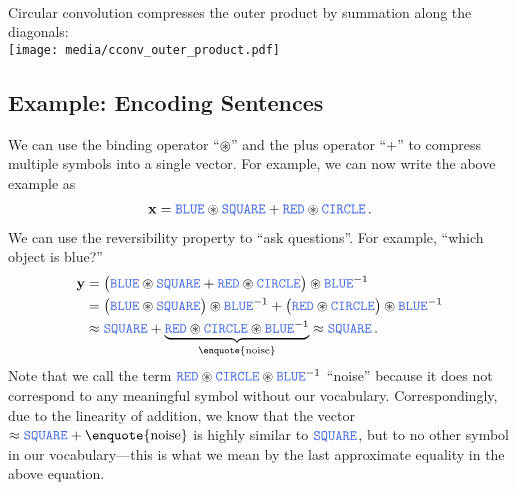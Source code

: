 \documentclass[10pt,letterpaper,oneside]{article}
\begin{document}
{\begin{align*}
\end{align*}
Circular convolution compresses the outer product by summation along the diagonals:\\[0.25cm]
\hspace*{1.315cm}\texttt{[image: media/cconv\_outer\_product.pdf]}
}


\subsection{Example: Encoding Sentences}
We can use the binding operator \enquote{$\circledast$} and the plus operator \enquote{$+$} to compress multiple symbols into a single vector. For example, we can now write the above example as
\begin{align*}
	\vec x = \Obj{BLUE} \CC \Obj{SQUARE} + \Obj{RED} \CC \Obj{CIRCLE} \,.
\end{align*}
We can use the reversibility property to \enquote{ask questions}. For example, \enquote{which object is blue?}
\begin{align*}
	\vec y &= \big( \Obj{BLUE} \CC \Obj{SQUARE} + \Obj{RED} \CC \Obj{CIRCLE} \big) \CC \Obj{BLUE}^{-1} \\
		   &= \big( \Obj{BLUE} \CC \Obj{SQUARE} \big) \CC \Obj{BLUE}^{-1} + \big( \Obj{RED} \CC \Obj{CIRCLE} \big) \CC \Obj{BLUE}^{-1} \\
		   &\approx \Obj{SQUARE} + \underbrace{\Obj{RED} \CC \Obj{CIRCLE} \CC \Obj{BLUE}^{-1}}_{\text{\enquote{noise}}} 
		    \approx \Obj{SQUARE} \,.
\end{align*}
Note that we call the term $\Obj{RED} \CC \Obj{CIRCLE} \CC \Obj{BLUE}^{-1}$ \enquote{noise} because it does not correspond to any meaningful symbol without our vocabulary. Correspondingly, due to the linearity of addition, we know that the vector $\approx \Obj{SQUARE} + \text{\enquote{noise}}$ is highly similar to $\Obj{SQUARE}$, but to no other symbol in our vocabulary---this is what we mean by the last approximate equality in the above equation.
\end{document}
